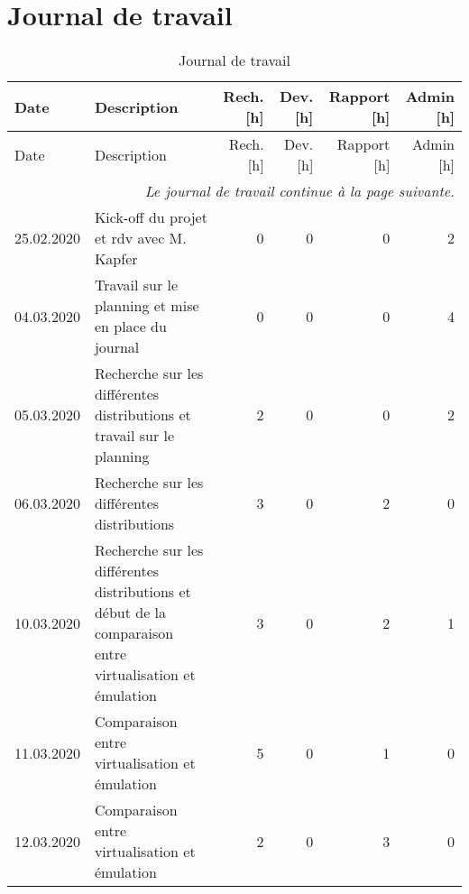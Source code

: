 \chapter{Journal de travail}

\begin{landscape}

\begin{longtable}[c]{lp{10cm}rrrr}
    \caption{Journal de travail}\\

    \hline
    Date & Description & Rech. [h] & Dev. [h] & Rapport [h] & Admin [h] \\
    \hline
    \endfirsthead
    
    \hline
    Date & Description & Rech. [h] & Dev. [h] & Rapport [h] & Admin [h] \\
    \hline
    \endhead
    
    \multicolumn{6}{r}{\small \it Le journal de travail continue à la page suivante.} \\
    \normalsize
    \endfoot
    
    \hline
    \endlastfoot


	25.02.2020 
	& Kick-off du projet et rdv avec M. Kapfer
	& 0 %
	& 0 %
	& 0 %
	& 2\\ %

	04.03.2020 
	& Travail sur le planning et mise en place du journal
	& 0 %
	& 0 %
	& 0 %
	& 4\\ %

	05.03.2020 
	& Recherche sur les différentes distributions et travail sur le planning
	& 2 %
	& 0 %
	& 0 %
	& 2\\ %

	06.03.2020 
	& Recherche sur les différentes distributions 
	& 3 %
	& 0 %
	& 2 %
	& 0\\ %

	10.03.2020 
	& Recherche sur les différentes distributions et début de la comparaison entre virtualisation et émulation
	& 3 %
	& 0 %
	& 2 %
	& 1\\ %
	
	
	11.03.2020 
	& Comparaison entre virtualisation et émulation
	& 5 %
	& 0 %
	& 1 %
	& 0\\ %
	
	12.03.2020 
	& Comparaison entre virtualisation et émulation
	& 2 %
	& 0 %
	& 3 %
	& 0\\ %
	

\end{longtable}
\end{landscape}
